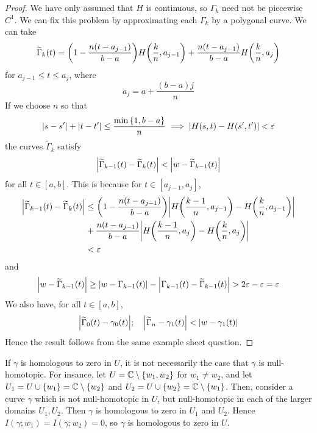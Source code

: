 \begin{proof}
	We have only assumed that \( H \) is continuous, so \( \Gamma_k \) need not be piecewise \( C^1 \).
	We can fix this problem by approximating each \( \Gamma_k \) by a polygonal curve.
	We can take
	\[
		\widetilde \Gamma_k(t) = \qty(1 - \frac{n(t-a_{j-1})}{b-a}) H\qty(\frac{k}{n},a_{j-1}) + \frac{n(t-a_{j-1})}{b-a} H\qty(\frac{k}{n}, a_j)
	\]
	for \( a_{j-1} \leq t \leq a_j \), where
	\[
		a_j = a + \frac{(b-a)j}{n}
	\]
	If we choose \( n \) so that
	\[
		\abs{s - s'} + \abs{t - t'} \leq \frac{\min\qty{1,b-a}}{n} \implies \abs{H(s,t) - H(s',t')} < \varepsilon
	\]
	the curves \( \widetilde \Gamma_k \) satisfy
	\[
		\abs{\widetilde \Gamma_{k-1}(t) - \widetilde \Gamma_k(t)} < \abs{w - \widetilde \Gamma_{k-1}(t)}
	\]
	for all \( t \in [a,b] \).
	This is because for \( t \in [a_{j-1}, a_j] \),
	\begin{align*}
		\abs{\widetilde \Gamma_{k-1}(t) - \widetilde \Gamma_k(t)} & \leq \qty(1 - \frac{n(t-a_{j-1})}{b-a}) \abs{H\qty(\frac{k-1}{n}, a_{j-1}) - H\qty(\frac{k}{n}, a_{j-1})} \\
		                                                          & + \frac{n(t-a_{j-1})}{b-a} \abs{ H\qty(\frac{k-1}{n},a_j) - H\qty(\frac{k}{n},a_j) }                      \\
		                                                          & < \varepsilon
	\end{align*}
	and
	\[
		\abs{w-\widetilde \Gamma_{k-1}(t)} \geq \abs{w - \Gamma_{k-1}(t)} - \abs{\Gamma_{k-1}(t) - \widetilde \Gamma_{k-1}(t)} > 2\varepsilon - \varepsilon = \varepsilon
	\]
	We also have, for all \( t \in [a,b] \),
	\[
		\abs{\widetilde \Gamma_0(t) - \gamma_0(t)};\quad \abs{\widetilde \Gamma_n - \gamma_1(t)} < \abs{w - \gamma_1(t)}
	\]
	Hence the result follows from the same example sheet question.
\end{proof}
\begin{remark}
	If \( \gamma \) is homologous to zero in \( U \), it is not necessarily the case that \( \gamma \) is null-homotopic.
	For insance, let \( U = \mathbb C \setminus \qty{w_1,w_2} \) for \( w_1 \neq w_2 \), and let \( U_1 = U \cup \qty{w_1} = \mathbb C \setminus \qty{w_2} \) and \( U_2 = U \cup \qty{w_2} = \mathbb C \setminus \qty{w_1} \).
	Then, consider a curve \( \gamma \) which is not null-homotopic in \( U \), but null-homotopic in each of the larger domains \( U_1, U_2 \).
	Then \( \gamma \) is homologous to zero in \( U_1 \) and \( U_2 \).
	Hence \( I(\gamma;w_1) = I(\gamma;w_2) = 0 \), so \( \gamma \) is homologous to zero in \( U \).
\end{remark}
